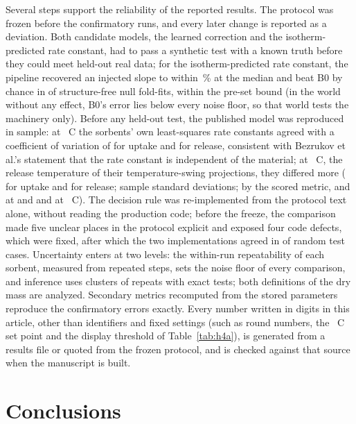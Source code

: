 \documentclass[12pt]{article}
\begin{document}
Several steps support the reliability of the reported results. The protocol was frozen before the confirmatory runs,
and every later change is reported as a deviation. Both candidate models, the learned correction and the
isotherm-predicted rate constant, had to pass a synthetic test with a known truth before they could meet held-out real
data; for the isotherm-predicted rate constant, the pipeline recovered an injected slope to within
\,\% at the median and beat B0 by chance in  of  structure-free
null fold-fits, within the pre-set bound (in the world without any effect, B0's error lies below every noise floor,
so that world tests the machinery only). Before any held-out test, the published model was
reproduced in sample: at ~\textdegree C the sorbents' own least-squares rate constants agreed with a coefficient of
variation of  for uptake and  for release, consistent with Bezrukov et al.'s
statement that the rate constant is independent of the material; at ~\textdegree C, the release temperature of their temperature-swing projections, they differed more ( for
uptake and  for release; sample standard deviations; by the scored metric,  and
 at  and  and  at ~\textdegree C). The decision rule
was re-implemented from the protocol text alone, without reading the production code; before the freeze, the
comparison made five unclear places in the protocol explicit and exposed four code defects, which were fixed, after
which the two implementations agreed in  of  random test cases. Uncertainty enters at two levels: the within-run repeatability of each sorbent,
measured from repeated steps, sets the noise floor of every comparison, and inference uses clusters of repeats with
exact tests; both definitions of the dry mass are analyzed. Secondary metrics recomputed from the stored parameters
reproduce the confirmatory errors exactly. Every number written in digits in this article, other than identifiers and fixed
settings (such as round numbers, the ~\textdegree C set point and the display threshold of Table~\ref{tab:h4a}), is
generated from a results file or quoted from the frozen protocol, and is checked against that source when the
manuscript is built.

\section{Conclusions}
\end{document}
